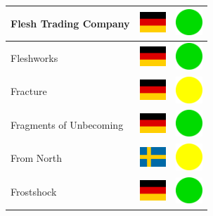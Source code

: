 \documentclass[12pt, a4paper, twoside]{report}
\begin{document}
\begin{center}
\begin{longtable}{|p{5cm}|p{2cm}|p{2cm}|}
 Flesh Trading Company                                      & \includegraphics[width=1cm]{../4x3/de} &   \includegraphics[width=1cm]{../likes/y} \\ \hline
 Fleshworks                                                 & \includegraphics[width=1cm]{../4x3/de} &   \includegraphics[width=1cm]{../likes/y} \\ \hline
 Fracture                                                   & \includegraphics[width=1cm]{../4x3/de} &   \includegraphics[width=1cm]{../likes/m} \\ \hline
 Fragments of Unbecoming                                    & \includegraphics[width=1cm]{../4x3/de} &   \includegraphics[width=1cm]{../likes/y} \\ \hline
 From North                                                 & \includegraphics[width=1cm]{../4x3/se} &   \includegraphics[width=1cm]{../likes/m} \\ \hline
 Frostshock                                                 & \includegraphics[width=1cm]{../4x3/de} &   \includegraphics[width=1cm]{../likes/y} \\ \hline

\end{longtable}
\end{center}
\end{document}
